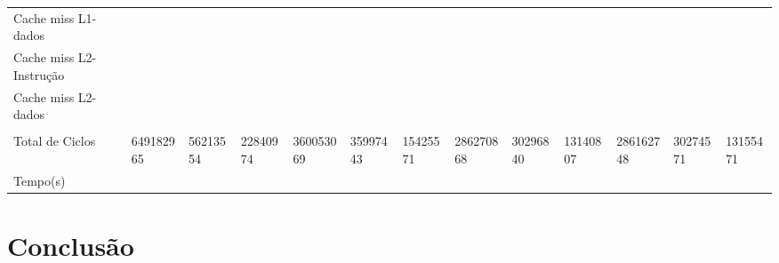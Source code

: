 \documentclass[pdftex,12pt,a4paper]{article}
\begin{document}
\begin{table}[h]
{\begin{tabular}{l|lll|lll|lll|lll|}
Cache miss L1-dados     &           &          &          &           &          &          &           &          &          &           &          &          \\
Cache miss L2-Instrução &           &          &          &           &          &          &           &          &          &           &          &          \\
Cache miss L2-dados     &           &          &          &           &          &          &           &          &          &           &          &          \\
                        &           &          &          &           &          &          &           &          &          &           &          &          \\ \hline
Total de Ciclos         & 649182965 & 56213554 & 22840974 & 360053069 & 35997443 & 15425571 & 286270868 & 30296840 & 13140807 & 286162748 & 30274571 & 13155471 \\ \hline
Tempo(s)                &           &          &          &           &          &          &           &          &          &           &          &        \\ \hline 
\end{tabular}
}
\end{table}

\section{Conclusão}
\end{document}

